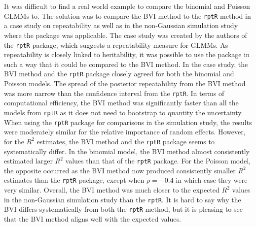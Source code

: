 \\
\\
It was difficult to find a real world example to compare the binomial and Poisson GLMMs to. The solution was to compare the BVI method to the \texttt{rptR} method in a case study on repeatability as well as in the non-Gaussian simulation study where the package was applicable. The case study was created by the authors of the \texttt{rptR} package, which suggests a repeatability measure for GLMMs. As repeatability is closely linked to heritability, it was possible to use the package in such a way that it could be compared to the BVI method. In the case study, the BVI method and the \texttt{rptR} package closely agreed for both the binomial and Poisson models. The spread of the posterior repeatability from the BVI method was more narrow than the confidence interval from the \texttt{rptR}. In terms of computational efficiency, the BVI method was significantly faster than all the models from \texttt{rptR} as it does not need to bootstrap to quantity the uncertainty. When using the \texttt{rptR} package for comparisons in the simulation study, the results were moderately similar for the relative importance of random effects. However, for the $R^2$ estimates, the BVI method and the \texttt{rptR} package seems to systematically differ. In the binomial model, the BVI method almost consistently estimated larger $R^2$ values than that of the \texttt{rptR} package. For the Poisson model, the opposite occurred as the BVI method now produced consistently smaller $R^2$ estimates than the \texttt{rptR} package, except when $\rho=-0.4$ in which case they were very similar. Overall, the BVI method was much closer to the expected $R^2$ values in the non-Gaussian simulation study than the \texttt{rptR}. It is hard to say why the BVI differs systematically from both the \texttt{rptR} method, but it is pleasing to see that the BVI method aligns well with the expected values.
\\
\\
